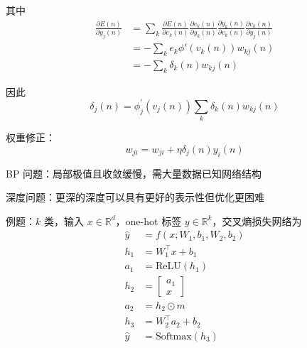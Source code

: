 \documentclass[openany]{ctexbook}
\theoremstyle{kaiti}
\theoremstyle{normal}
\begin{document}
其中
\begin{equation}
  \begin{aligned}
    \frac{\partial E\left(n \right)}{\partial y_j\left(n \right)}
    &=\sum_k{\frac{\partial E\left(n \right)}{\partial e_k\left(n \right)}\frac{\partial e_k\left(n \right)}{\partial y_k\left(n \right)}\frac{\partial y_k\left(n \right)}{\partial v_k\left(n \right)}\frac{\partial v_k\left(n \right)}{\partial y_j\left(n \right)}}\\
    &=-\sum_ke_k\phi '\left(v_k\left(n \right)\right)w_{kj}\left(n \right)\\
    &=-\sum_k\delta_k\left(n \right)w_{kj}\left(n \right)
  \end{aligned}
\end{equation}

因此
\begin{equation}
  \delta_j\left(n \right)=\phi_{j}^{'}\left(v_j\left(n \right)\right)\sum_k\delta_k\left(n \right)w_{kj}\left(n \right)
\end{equation}

权重修正：
\begin{equation}
  w_{ji}=w_{ji}+\eta \delta_j\left(n \right)y_i\left(n \right)
\end{equation}

BP 问题：局部极值且收敛缓慢，需大量数据已知网络结构

深度问题：更深的深度可以具有更好的表示性但优化更困难

例题：$k$ 类，输入 $x\in \mathbb{R} ^d$，one-hot 标签 $y\in \mathbb{R} ^k$，交叉熵损失网络为
\begin{equation}
  \begin{aligned}
    \hat{y}&=f\left(x;W_1,b_1,W_2,b_2 \right)\\ 
    h_1&=W_{1}^{\top}x+b_1 \\
    a_1&=\mathrm{ReLU}\left(h_1 \right)\\
    h_2&=\begin{bmatrix}
      a_1\\ x
    \end{bmatrix} \\
    a_2&=h_2\odot m \\
    h_3&=W_{2}^{\top}a_2+b_2 \\
    \hat{y}&=\mathrm{Softmax}\left(h_3 \right)
  \end{aligned}
\end{equation}
\end{document}
